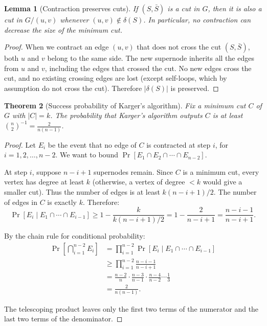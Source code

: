 \documentclass[twoside,12pt]{book}
\theoremstyle{plain}
\newtheorem{theorem}{Theorem}[chapter]
\newtheorem{lemma}[theorem]{Lemma}
\theoremstyle{definition}
\theoremstyle{remark}
\begin{document}
\begin{lemma}[Contraction preserves cuts]
\label{lem:contraction-preserves}
If $(S, \bar{S})$ is a cut in $G$, then it is also a cut in $G / (u,v)$ whenever $(u,v) \notin \delta(S)$. In particular, no contraction can decrease the size of the minimum cut.
\end{lemma}

\begin{proof}
When we contract an edge $(u, v)$ that does not cross the cut $(S, \bar{S})$, both $u$ and $v$ belong to the same side. The new supernode inherits all the edges from $u$ and $v$, including the edges that crossed the cut. No new edges cross the cut, and no existing crossing edges are lost (except self-loops, which by assumption do not cross the cut). Therefore $|\delta(S)|$ is preserved.
\end{proof}

\begin{theorem}[Success probability of Karger's algorithm]
\label{thm:karger-prob}
Fix a minimum cut $C$ of $G$ with $|C| = k$. The probability that Karger's algorithm outputs $C$ is at least $\binom{n}{2}^{-1} = \frac{2}{n(n-1)}$.
\end{theorem}

\begin{proof}
Let $E_i$ be the event that no edge of $C$ is contracted at step $i$, for $i = 1, 2, \ldots, n-2$. We want to bound $\Pr[E_1 \cap E_2 \cap \cdots \cap E_{n-2}]$.

At step $i$, suppose $n - i + 1$ supernodes remain. Since $C$ is a minimum cut, every vertex has degree at least $k$ (otherwise, a vertex of degree $< k$ would give a smaller cut). Thus the number of edges is at least $k(n - i + 1) / 2$. The number of edges in $C$ is exactly $k$. Therefore:
\[
\Pr[E_i \mid E_1 \cap \cdots \cap E_{i-1}] \geq 1 - \frac{k}{k(n - i + 1)/2} = 1 - \frac{2}{n - i + 1} = \frac{n - i - 1}{n - i + 1}.
\]

By the chain rule for conditional probability:
\begin{align*}
\Pr\left[\bigcap_{i=1}^{n-2} E_i\right]
&= \prod_{i=1}^{n-2} \Pr[E_i \mid E_1 \cap \cdots \cap E_{i-1}] \\
&\geq \prod_{i=1}^{n-2} \frac{n - i - 1}{n - i + 1} \\
&= \frac{n-2}{n} \cdot \frac{n-3}{n-1} \cdot \frac{n-4}{n-2} \cdots \frac{1}{3} \\
&= \frac{2}{n(n-1)}.
\end{align*}

The telescoping product leaves only the first two terms of the numerator and the last two terms of the denominator.
\end{proof}
\end{document}
